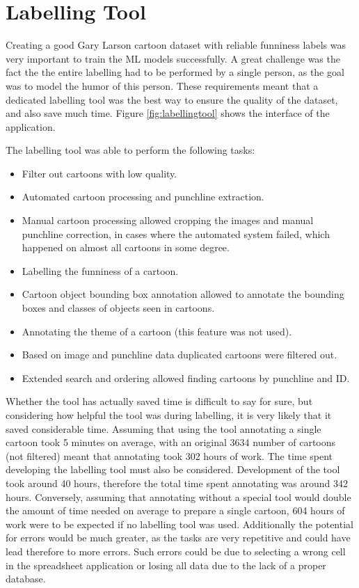 \documentclass[draft,final,oneside]{vutinfth} %
\begin{document}
\fi

\section{Labelling Tool}

Creating a good Gary Larson cartoon dataset with reliable funniness labels was very important to train the ML models successfully. A great challenge was the fact the the entire labelling had to be performed by a single person, as the goal was to model the humor of this person. These requirements meant that a dedicated labelling tool was the best way to ensure the quality of the dataset, and also save much time. Figure \ref{fig:labellingtool} shows the interface of the application.

The labelling tool was able to perform the following tasks:
\begin{itemize}
\item Filter out cartoons with low quality.
\item Automated cartoon processing and punchline extraction.
\item Manual cartoon processing allowed cropping the images and manual punchline correction, in cases where the automated system failed, which happened on almost all cartoons in some degree.
\item  Labelling the funniness of a cartoon.
\item Cartoon object bounding box annotation allowed to annotate the bounding boxes and classes of objects seen in cartoons.
\item Annotating the theme of a cartoon (this feature was not used).
\item Based on image and punchline data duplicated cartoons were filtered out.
\item Extended search and ordering allowed finding cartoons by punchline and ID.
\end{itemize}

Whether the tool has actually saved time is difficult to say for sure, but considering how helpful the tool was during labelling, it is very likely that it saved considerable time. Assuming that using the tool annotating a single cartoon took 5 minutes on average, with an original 3634 number of cartoons (not filtered) meant that annotating took 302 hours of work. The time spent developing the labelling tool must also be considered. Development of the tool took around 40 hours, therefore the total time spent annotating was around 342 hours. Conversely, assuming that annotating without a special tool would double the amount of time needed on average to prepare a single cartoon, 604 hours of work were to be expected if no labelling tool was used. Additionally the potential for errors would be much greater, as the tasks are very repetitive and could have lead therefore to more errors. Such errors could be due to selecting a wrong cell in the spreadsheet application or losing all data due to the lack of a proper database.
\end{document}
